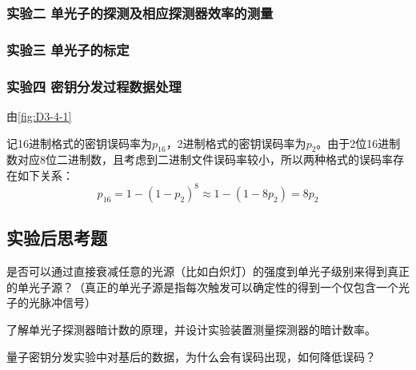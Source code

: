 \documentclass[dvipsnames, svgnames,a4paper,11pt]{article}
\begin{document}
	\subsubsection{实验二 \quad 单光子的探测及相应探测器效率的测量}




	\subsubsection{实验三 \quad 单光子的标定}




	\subsubsection{实验四 \quad 密钥分发过程数据处理}


		由\cref{fig:D3-4-1}
			

		记16进制格式的密钥误码率为$p_{16}$，2进制格式的密钥误码率为$p_{2}$。由于2位16进制数对应8位二进制数，且考虑到二进制文件误码率较小，所以两种格式的误码率存在如下关系：
		\[
			p_{16} = 1 - (1 - p_{2})^8 \approx 1 - (1 - 8p_{2}) = 8p_{2}
		\]



	
\subsection{实验后思考题}

\begin{question}
	是否可以通过直接衰减任意的光源（比如白炽灯）的强度到单光子级别来得到真正的单光子源？（真正的单光子源是指每次触发可以确定性的得到一个仅包含一个光子的光脉冲信号）
\end{question}









\begin{question}
	了解单光子探测器暗计数的原理，并设计实验装置测量探测器的暗计数率。
\end{question}









\begin{question}
	量子密钥分发实验中对基后的数据，为什么会有误码出现，如何降低误码？
\end{question}
\end{document}
